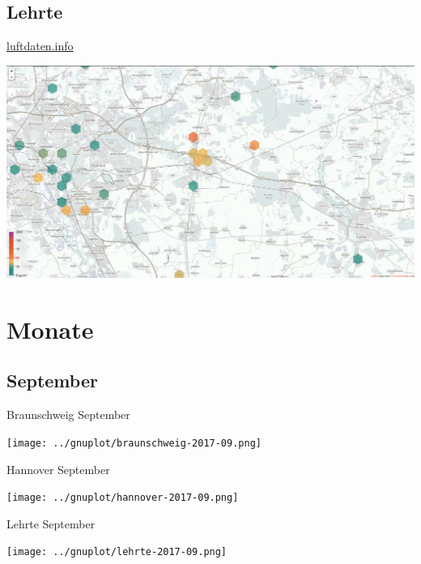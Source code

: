 \documentclass[aspectratio=169]{beamer} %
\begin{document}
\subsection{Lehrte}
\begin{frame}{\href{http://hannover.maps.luftdaten.info/\#12/52.373/10.005}{luftdaten.info}}
  \begin{center}
    \includegraphics[width=\textwidth]{../screenshots/luftdaten-zoom-a.png}
  \end{center}
\end{frame}

\section{Monate}
\subsection{September}
\begin{frame}{Braunschweig September}
  \begin{center}
    \texttt{[image: ../gnuplot/braunschweig-2017-09.png]}
  \end{center}
\end{frame}
\begin{frame}{Hannover September}
  \begin{center}
    \texttt{[image: ../gnuplot/hannover-2017-09.png]}
  \end{center}
\end{frame}
\begin{frame}{Lehrte September}
  \begin{center}
    \texttt{[image: ../gnuplot/lehrte-2017-09.png]}
  \end{center}
\end{frame}
\end{document}
